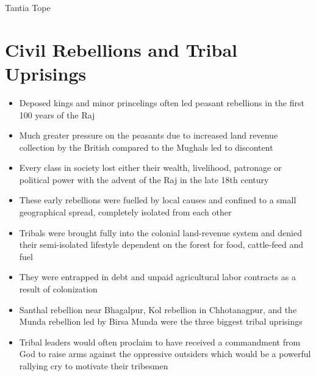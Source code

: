 \begin{marginfigure}[-5.5in]
    \caption{Tantia Tope}
\end{marginfigure}

\section{Civil Rebellions and Tribal Uprisings}
\begin{itemize}
    \item Deposed kings and minor princelings often led peasant rebellions in the first 100 years of the Raj
    \item Much greater pressure on the peasants due to increased land revenue collection by the British compared to the Mughals led to discontent
    \item Every class in society lost either their wealth, livelihood, patronage or political power with the advent of the Raj in the late 18th century
    \item These early rebellions were fuelled by local causes and confined to a small geographical spread, completely isolated from each other
    \item Tribals were brought fully into the colonial land-revenue system and denied their semi-isolated lifestyle dependent on the forest for food, cattle-feed and fuel
    \item They were entrapped in debt and unpaid agricultural labor contracts as a result of colonization
    \item Santhal rebellion near Bhagalpur, Kol rebellion in Chhotanagpur, and the Munda rebellion led by Birsa Munda were the three biggest tribal uprisings
    \item Tribal leaders would often proclaim to have received a commandment from God to raise arms against the oppressive outsiders which would be a powerful rallying cry to motivate their tribesmen
\end{itemize}

